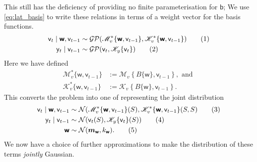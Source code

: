 \documentclass{article}
\newcommand\numberthis{\addtocounter{equation}{1}\tag{\theequation}}
\newcommand{\vv}[1]{\boldsymbol{#1}}
\newcommand{\rv}[1]{\mathsf{#1}}
\newcommand{\vrv}[1]{\vv{\rv{#1}}}
\newcommand{\dist}[1]{\mathcal{#1}}
\newcommand{\set}[1]{#1}
\newcommand{\op}[1]{\mathscr{#1}}
\newcommand{\gvn}{\mid}
\newcommand{\lat}{\rv{b}}   %
\newcommand{\latwt}{\vrv{w}}
\begin{document}

This still has the deficiency of providing no finite parameterisation for \(\lat\); We use \eqref{eq:lat_basis} to write these relations in terms of a weight vector for the basis functions.
\begin{align*}
\rv{v}_{t}\gvn \latwt,\rv{v}_{t-1}
&\sim \dist{GP}(\op{M}^*_v\{\latwt,\rv{v}_{t-1}\},\op{K}^*_{v}\{\latwt,\rv{v}_{t-1}\})\numberthis \label{eq:mvn_approx_proc} \\
\rv{y}_{t}\gvn \rv{v}_{t-1}
&\sim \dist{GP}(\rv{v}_{t},\op{K}_{y}\{\rv{v}_{t}\}) \numberthis \label{eq:mvn_approx_obs} \\
\end{align*}
Here we have defined
\begin{align*}
    \op{M}^*_v\{\latwt,\rv{v}_{t-1}\}&:=\op{M}_v\left\{B\{\latwt\},\rv{v}_{t-1}\right\}, \text{ and }\\ \op{K}^*_v\{\latwt,\rv{v}_{t-1}\}&:=\op{K}_v\left\{B\{\latwt\},\rv{v}_{t-1}\right\}.
\end{align*}
This converts the problem into one of representing the joint distribution
\begin{align*}
\rv{v}_{t}\gvn \latwt,\rv{v}_{t-1}
&\sim \dist{N}(\op{M}^*_v\{\latwt,\rv{v}_{t-1}\}(\set{S}),\op{K}^*_{v}\{\latwt,\rv{v}_{t-1}\}(\set{S},\set{S})
\numberthis \label{eq:mvn_approx_proc_fidi} \\
\rv{y}_{t}\gvn \rv{v}_{t-1}
&\sim \dist{N}(\rv{v}_{t}(\set{S}),\op{K}_{y}\{\rv{v}_{t}\}(\set{S}))
\numberthis \label{eq:mvn_approx_obs_fidi} \\
\latwt &\sim \dist{N}(\vv{m}_{\latwt},k_{\latwt}).
\numberthis \label{eq:mvn_approx_prior_fidi}
\end{align*}
We now have a choice of further approximations to make the distribution of these terms \emph{jointly} Gaussian.
\end{document}
